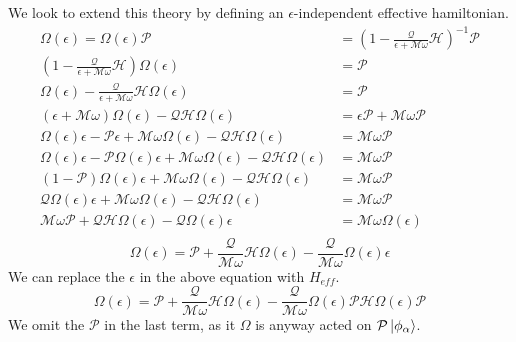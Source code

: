 We look to extend this theory by defining an $\epsilon$-independent effective hamiltonian.
\begin{align*}
 \Omega(\epsilon) = \Omega(\epsilon)\mathcal{P} &= \left(1 - \frac{\mathcal{Q}}{\epsilon + \mathcal{M}\omega}\mathcal{H}\right)^{-1} \mathcal{P} \\
 \left(1 - \frac{\mathcal{Q}}{\epsilon + \mathcal{M}\omega}\mathcal{H}\right)\Omega(\epsilon) &= \mathcal{P} \\
 \Omega(\epsilon) - \frac{\mathcal{Q}}{\epsilon + \mathcal{M}\omega}\mathcal{H}\Omega(\epsilon) &= \mathcal{P} \\
 (\epsilon + \mathcal{M}\omega)\Omega(\epsilon) - \mathcal{Q}\mathcal{H}\Omega(\epsilon) &= \epsilon\mathcal{P} + \mathcal{M}\omega\mathcal{P} \\
 \Omega(\epsilon)\epsilon - \mathcal{P}\epsilon + \mathcal{M}\omega\Omega(\epsilon) - \mathcal{Q}\mathcal{H}\Omega(\epsilon) &= \mathcal{M}\omega\mathcal{P} \\
 \Omega(\epsilon)\epsilon - \mathcal{P}\Omega(\epsilon)\epsilon + \mathcal{M}\omega\Omega(\epsilon) - \mathcal{Q}\mathcal{H}\Omega(\epsilon) &= \mathcal{M}\omega\mathcal{P} \\
 (1-\mathcal{P})\Omega(\epsilon)\epsilon + \mathcal{M}\omega\Omega(\epsilon) - \mathcal{Q}\mathcal{H}\Omega(\epsilon) &= \mathcal{M}\omega\mathcal{P} \\
 \mathcal{Q}\Omega(\epsilon)\epsilon + \mathcal{M}\omega\Omega(\epsilon) - \mathcal{Q}\mathcal{H}\Omega(\epsilon) &= \mathcal{M}\omega\mathcal{P} \\
 \mathcal{M}\omega\mathcal{P} + \mathcal{Q}\mathcal{H}\Omega(\epsilon) - \mathcal{Q}\Omega(\epsilon)\epsilon &= \mathcal{M}\omega\Omega(\epsilon) \\ 
\end{align*}
\begin{equation}
 \Omega(\epsilon) = \mathcal{P} + \frac{\mathcal{Q}}{\mathcal{M}\omega}\mathcal{H}\Omega(\epsilon) - \frac{\mathcal{Q}}{\mathcal{M}\omega}\Omega(\epsilon)\epsilon
\end{equation} We can replace the $\epsilon$ in the above equation with $H_{eff}$.
\begin{equation*}
 \Omega(\epsilon) = \mathcal{P} + \frac{\mathcal{Q}}{\mathcal{M}\omega}\mathcal{H}\Omega(\epsilon) - \frac{\mathcal{Q}}{\mathcal{M}\omega}\Omega(\epsilon)\mathcal{P}\mathcal{H}\Omega(\epsilon)\mathcal{P}
\end{equation*} We omit the $\mathcal{P}$ in the last term, as it $\Omega$ is anyway acted on $\mathcal{P}\ket{\phi_\alpha}$.

